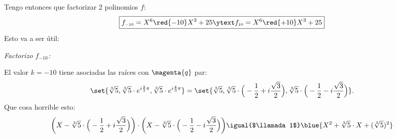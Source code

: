 Tengo entonces que factorizar 2 polinomios $f$:
$$
  \boxed{
    f_{\scriptscriptstyle -10} = X^6 \red{- 10}X^3 + 25
    \ytext
    f_{\scriptscriptstyle 10} = X^6 \red{+ 10}X^3 + 25
  }
$$
Esto va a ser útil:
\begin{center}
\end{center}

\bigskip

\textit{Factorizo $f_{\scriptscriptstyle -10}$:}\par

El valor $k = -10$ tiene asociadas las raíces con $\magenta{q}$ par:
$$
  \set{\sqrt[3]{5}, \sqrt[3]{5} \cdot e^{i\frac{2}{3}\pi}, \sqrt[3]{5} \cdot e^{i\frac{4}{3}\pi} } =
  \set{\sqrt[3]{5}, \sqrt[3]{5} \cdot \Big(- \frac{1}{2} + i\frac{\sqrt{3}}{2} \Big), \sqrt[3]{5} \cdot \Big(- \frac{1}{2} - i\frac{\sqrt{3}}{2} \Big) }.
$$
Que cosa horrible esto:
$$
  \bigg(X - \sqrt[3]{5} \cdot \Big(- \frac{1}{2} + i\frac{\sqrt{3}}{2}\Big)\bigg)
  \cdot
  \bigg(X - \sqrt[3]{5} \cdot \Big(- \frac{1}{2} - i\frac{\sqrt{3}}{2}\Big)\bigg)
  \igual{$\llamada1$}
  \blue{X^2  + \sqrt[3]{5} \cdot X + (\sqrt[3]{5})^2}
$$

\begin{center}
\end{center}

